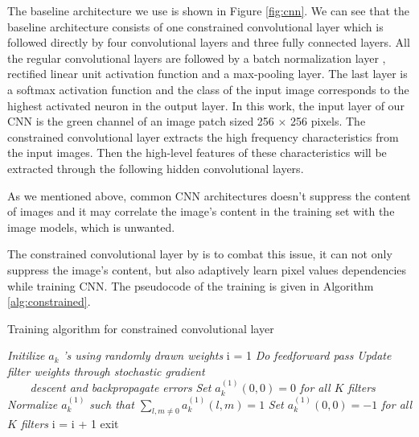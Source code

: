 \documentclass[a4paper, 9pt, twocolumn]{extarticle}
\begin{document}
The baseline architecture we use is shown in Figure \ref{fig:cnn}. We can see that the baseline architecture consists of one constrained convolutional layer which is followed directly by four convolutional layers and three fully connected layers. All the regular convolutional layers are followed by a batch normalization layer \cite{ioffe2015batch}, rectified linear unit activation function \cite{nair2010rectified} and a max-pooling layer. The last layer is a softmax activation function and the class of the input image corresponds to the highest activated neuron in the output layer. In this work, the input layer of our CNN is the green channel of an image patch sized 256 $ \times $ 256 pixels. The constrained convolutional layer extracts the high frequency characteristics from the input images. Then the high-level features of these characteristics will be extracted through the following hidden convolutional layers.

As we mentioned above, common CNN architectures doesn't suppress the content of images and it may correlate the image's content in the training set with the image models, which is unwanted. 

The constrained convolutional layer by \citet{10.1145/2909827.2930786} is to combat this issue, it can not only suppress the image's content, but also adaptively learn pixel values dependencies while training CNN. The pseudocode of the training is given in Algorithm \ref{alg:constrained}. 

\begin{algorithm} 
	\caption{Training algorithm for constrained convolutional layer}
	\label{alg:constrained}
	\begin{algorithmic}[1]
		\State \textit{Initilize} $ a_k $ \textit{’s using randomly drawn weights}
		\State i = 1
		\State \textit{Do feedforward pass}
		\State \textit{Update filter weights through stochastic gradient \\ 
			\ \ \ \ descent and backpropagate errors}
		\State \textit{Set $ a_k^{(1)}(0, 0) = 0 $ for all $ K $ filters}
		\State \textit{Normalize $ a_k^{(1)} $ such that $ \sum_{l,m \neq 0} a_k^{(1)}(l, m) = 1 $ }
		\State \textit{Set $ a_k^{(1)}(0, 0) = -1 $ for all $ K $ filters}
		i = i + 1
			\State exit
		\EndIf
		\EndWhile
	\end{algorithmic}
\end{algorithm}

\end{document}
